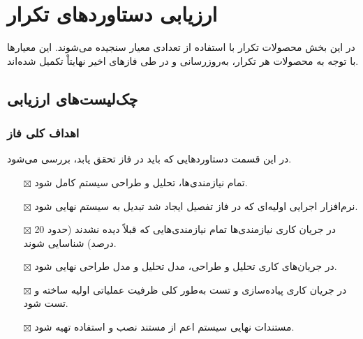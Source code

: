 \chapter{ارزیابی دستاوردهای تکرار}
در این بخش محصولات تکرار با استفاده از تعدادی معیار سنجیده می‌شوند. این معیارها با توجه به محصولات هر تکرار، به‌روزرسانی و در طی فازهای اخیر نهایتاْ تکمیل شده‌اند.
\section{چک‌لیست‌های ارزیابی}

\iffalse
Item icons for checklists:	
	\item[$\square$]
	\item[$\boxtimes$]
\fi

\subsection{\hspace*{0.2cm}اهداف کلی فاز }
در این قسمت دستاوردهایی که باید در فاز  تحقق یابد، بررسی می‌شود.
\begin{itemize} \setlength\itemsep{0cm}
	\item[$\boxtimes$]
	تمام نیازمندی‌ها، تحلیل و طراحی سیستم کامل شود.
	\item[$\boxtimes$]
	نرم‌افزار اجرایی اولیه‌ای که در فاز تفصیل ایجاد شد تبدیل به سیستم نهایی شود.
	\item[$\boxtimes$]
	در جریان کاری نیازمندی‌ها تمام نیازمندی‌هایی که قبلاً دیده نشدند (حدود 20 درصد) شناسایی شوند.
	\item[$\boxtimes$]
	در جریان‌های کاری تحلیل و طراحی، مدل تحلیل و مدل طراحی نهایی شود.
	\item[$\boxtimes$]
	در جریان کاری پیاده‌سازی و تست به‌طور کلی ظرفیت عملیاتی اولیه ساخته و تست شود.
	\item[$\boxtimes$]
	مستندات نهایی سیستم اعم از مستند نصب و استفاده تهیه شود.
	
\end{itemize}

